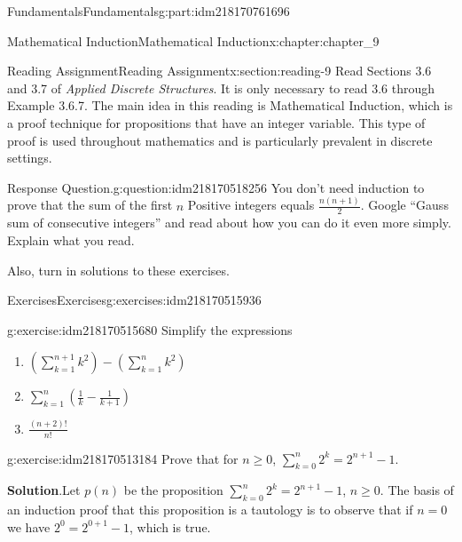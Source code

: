 \documentclass[oneside,10pt,]{book}
\newcommand{\blocktitlefont}{\relax}
\numberwithin{equation}{section}
\begin{document}
\begin{partptx}{Fundamentals}{}{Fundamentals}{}{}{g:part:idm218170761696}
\begin{chapterptx}{Mathematical Induction}{}{Mathematical Induction}{}{}{x:chapter:chapter_9}
\index{}%
%
%
\typeout{************************************************}
\typeout{************************************************}
%
\begin{sectionptx}{Reading Assignment}{}{Reading Assignment}{}{}{x:section:reading-9}
Read Sections 3.6 and 3.7 of \emph{Applied Discrete Structures}. It is only necessary to read 3.6 through Example 3.6.7.   The main idea in this reading is Mathematical Induction, which is a proof technique for propositions that have an integer variable.  This type of proof is used throughout mathematics and is particularly prevalent in discrete settings.%
\begin{question}{Response Question.}{g:question:idm218170518256}%
You don’t need induction to prove that the sum of the first \(n\) Positive integers equals \(\frac{n(n+1)}{2}\). Google “Gauss sum of consecutive integers” and read about how you can do it even more simply. Explain what you read.%
\end{question}
Also, turn in solutions to these exercises.%
%
%
\typeout{************************************************}
\typeout{************************************************}
%
\begin{exercises-subsection-numberless}{Exercises}{}{Exercises}{}{}{g:exercises:idm218170515936}
\par\medskip\noindent%
%
\begin{exercisegroup}
\begin{divisionexerciseeg}{1}{}{}{g:exercise:idm218170515680}%
Simplify the expressions%
\begin{enumerate}[label=(\alph*)]
\item{}\(\displaystyle (\sum_{k=1}^{n+1}k^2) -(\sum_{k=1}^n k^2)\)%
\item{}\(\displaystyle \sum_{k=1}^n (\frac{1}{k}-\frac{1}{k+1})\)%
\item{}\(\displaystyle \frac{(n+2)!}{n!}\)%
\end{enumerate}
%
\end{divisionexerciseeg}%
\begin{divisionexerciseeg}{2}{}{}{g:exercise:idm218170513184}%
Prove that for \(n \ge 0\), \(\sum_{k=0}^n {2^k} = 2^{n+1}-1\).%
\par\smallskip%
\noindent\textbf{\blocktitlefont Solution}.\hypertarget{g:solution:idm218170510912}{}\quad{}Let \(p(n)\) be the proposition \(\sum_{k=0}^{n} 2^k = 2^{n+1}-1\), \(n\geq 0\).  The basis of an induction proof that this proposition is a tautology is to observe that if \(n=0\) we have \(2^0 = 2^{0+1}-1\), which is true.%

\end{divisionexerciseeg}
\end{exercisegroup}
\end{exercises-subsection-numberless}
\end{sectionptx}
\end{chapterptx}
\end{partptx}
\end{document}

